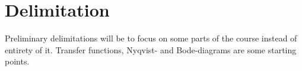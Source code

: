 \section{Delimitation}
Preliminary delimitations will be to focus on some parts of the course instead of entirety of it. Transfer functions, Nyqvist- and Bode-diagrams are some starting points. 


\iffalse
Avgränsningar: (slids)

Avgränsningarna ska ta upp vilka delar av det övergripande syftet som inte tas upp i arbetet, och anledningarna till detta. (Kan ingå i problem-/uppgiftsanalysen)
\fi